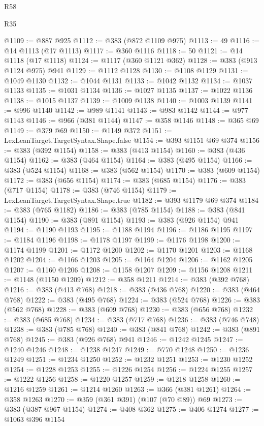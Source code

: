 \begin{lexlean}{R58}
\begin{lexlean}{R35}
\begin{coremodule}
{{{{{{{{{{{{{{{{{{{{{{{{{{{{{{{{{{{{{{{{{{{{{{{{{{{{@1109 := @887 @925
@1112 := @383 (@872 @1109 @975)
@1113 := 49
@1116 := @14 @1113 (@17 @1113)
@1117 := @360 @1116
@1118 := 50
@1121 := @14 @1118 (@17 @1118)
@1124 := @1117 (@360 @1121 @362)
@1128 := @383 (@913 @1124 @975) @941
@1129 := @1112 @1128
@1130 := @1108 @1129
@1131 := @1049 @1130
@1132 := @1044 @1131
@1133 := @1042 @1132
@1134 := @1037 @1133
@1135 := @1031 @1134
@1136 := @1027 @1135
@1137 := @1022 @1136
@1138 := @1015 @1137
@1139 := @1009 @1138
@1140 := @1003 @1139
@1141 := @996 @1140
@1142 := @989 @1141
@1143 := @983 @1142
@1144 := @977 @1143
@1146 := @966 (@381 @1144)
@1147 := @358 @1146
@1148 := @365 @69
@1149 := @379 @69
@1150 := @1149 @372
@1151 := LexLeanTarget.TargetSyntax.Shape.false
@1154 := @393 @1151 @69 @374
@1156 := @383 (@392 @1154)
@1158 := @383 (@413 @1154)
@1160 := @383 (@436 @1154)
@1162 := @383 (@464 @1154)
@1164 := @383 (@495 @1154)
@1166 := @383 (@524 @1154)
@1168 := @383 (@562 @1154)
@1170 := @383 (@609 @1154)
@1172 := @383 (@656 @1154)
@1174 := @383 (@685 @1154)
@1176 := @383 (@717 @1154)
@1178 := @383 (@746 @1154)
@1179 := LexLeanTarget.TargetSyntax.Shape.true
@1182 := @393 @1179 @69 @374
@1184 := @383 (@765 @1182)
@1186 := @383 (@785 @1154)
@1188 := @383 (@841 @1154)
@1190 := @383 (@891 @1154)
@1193 := @383 (@926 @1154) @941
@1194 := @1190 @1193
@1195 := @1188 @1194
@1196 := @1186 @1195
@1197 := @1184 @1196
@1198 := @1178 @1197
@1199 := @1176 @1198
@1200 := @1174 @1199
@1201 := @1172 @1200
@1202 := @1170 @1201
@1203 := @1168 @1202
@1204 := @1166 @1203
@1205 := @1164 @1204
@1206 := @1162 @1205
@1207 := @1160 @1206
@1208 := @1158 @1207
@1209 := @1156 @1208
@1211 := @1148 (@1150 @1209)
@1212 := @358 @1211
@1214 := @383 (@392 @768)
@1216 := @383 (@413 @768)
@1218 := @383 (@436 @768)
@1220 := @383 (@464 @768)
@1222 := @383 (@495 @768)
@1224 := @383 (@524 @768)
@1226 := @383 (@562 @768)
@1228 := @383 (@609 @768)
@1230 := @383 (@656 @768)
@1232 := @383 (@685 @768)
@1234 := @383 (@717 @768)
@1236 := @383 (@746 @748)
@1238 := @383 (@785 @768)
@1240 := @383 (@841 @768)
@1242 := @383 (@891 @768)
@1245 := @383 (@926 @768) @941
@1246 := @1242 @1245
@1247 := @1240 @1246
@1248 := @1238 @1247
@1249 := @770 @1248
@1250 := @1236 @1249
@1251 := @1234 @1250
@1252 := @1232 @1251
@1253 := @1230 @1252
@1254 := @1228 @1253
@1255 := @1226 @1254
@1256 := @1224 @1255
@1257 := @1222 @1256
@1258 := @1220 @1257
@1259 := @1218 @1258
@1260 := @1216 @1259
@1261 := @1214 @1260
@1263 := @366 (@381 @1261)
@1264 := @358 @1263
@1270 := @359 (@361 @391) (@107 (@70 @89)) @69
@1273 := @383 (@387 @967 @1154)
@1274 := @408 @362
@1275 := @406 @1274
@1277 := @1063 @396 @1154
}}}}}}}}}}}}}}}}}}}}}}}}}}}}}}}}}}}}}}}}}}}}}}}}}}}}
\end{coremodule}
\end{lexlean}
\end{lexlean}
